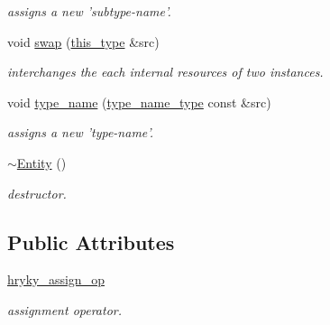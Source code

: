 \begin{DoxyCompactItemize}
\begin{DoxyCompactList}\small\item\em assigns a new 'subtype-\/name'. \end{DoxyCompactList}\item 
\hypertarget{classhryky_1_1http_1_1header_1_1media__type_1_1_entity_a460e851ad18cae44cfd956ab42abba8b}{void \hyperlink{classhryky_1_1http_1_1header_1_1media__type_1_1_entity_a460e851ad18cae44cfd956ab42abba8b}{swap} (\hyperlink{classhryky_1_1http_1_1header_1_1media__type_1_1_entity_ac2b17061949e39ad285a8517833ec4f4}{this\-\_\-type} \&src)}\label{classhryky_1_1http_1_1header_1_1media__type_1_1_entity_a460e851ad18cae44cfd956ab42abba8b}

\begin{DoxyCompactList}\small\item\em interchanges the each internal resources of two instances. \end{DoxyCompactList}\item 
\hypertarget{classhryky_1_1http_1_1header_1_1media__type_1_1_entity_a01c893af327d684719082eef74bdb02d}{void \hyperlink{classhryky_1_1http_1_1header_1_1media__type_1_1_entity_a01c893af327d684719082eef74bdb02d}{type\-\_\-name} (\hyperlink{classhryky_1_1_vector}{type\-\_\-name\-\_\-type} const \&src)}\label{classhryky_1_1http_1_1header_1_1media__type_1_1_entity_a01c893af327d684719082eef74bdb02d}

\begin{DoxyCompactList}\small\item\em assigns a new 'type-\/name'. \end{DoxyCompactList}\item 
\hypertarget{classhryky_1_1http_1_1header_1_1media__type_1_1_entity_a4fadd5fb78dbd75bf0e67a73aed70451}{\hyperlink{classhryky_1_1http_1_1header_1_1media__type_1_1_entity_a4fadd5fb78dbd75bf0e67a73aed70451}{$\sim$\-Entity} ()}\label{classhryky_1_1http_1_1header_1_1media__type_1_1_entity_a4fadd5fb78dbd75bf0e67a73aed70451}

\begin{DoxyCompactList}\small\item\em destructor. \end{DoxyCompactList}\end{DoxyCompactItemize}
\subsection*{Public Attributes}
\begin{DoxyCompactItemize}
\item 
\hypertarget{classhryky_1_1http_1_1header_1_1media__type_1_1_entity_a690e67774f1247460e2ee66d46bf2968}{\hyperlink{classhryky_1_1http_1_1header_1_1media__type_1_1_entity_a690e67774f1247460e2ee66d46bf2968}{hryky\-\_\-assign\-\_\-op}}\label{classhryky_1_1http_1_1header_1_1media__type_1_1_entity_a690e67774f1247460e2ee66d46bf2968}

\begin{DoxyCompactList}\small\item\em assignment operator. \end{DoxyCompactList}\end{DoxyCompactItemize}


